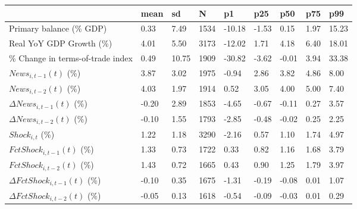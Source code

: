\begin{table}[htbp]
\begin{tabular}{|l|l|l|l|l|l|l|l|l|}\hline  
 & mean  & sd  & N  & p1  & p25  & p50  & p75  & p99  \\ \hline  
Primary balance (\% GDP) &      0.33 &      7.49 &      1534 &    -10.18 &     -1.53 &      0.15 &      1.97 &     15.23 \\ \hline 
Real YoY GDP Growth (\%) &      4.01 &      5.50 &      3173 &    -12.02 &      1.71 &      4.18 &      6.40 &     18.01 \\ \hline 
\% Change in terms-of-trade index &      0.49 &     10.75 &      1909 &    -30.82 &     -3.62 &     -0.01 &      3.94 &     33.38 \\ \hline 
$ News_{i,t-1}(t)$ (\%) &      3.87 &      3.02 &      1975 &     -0.94 &      2.86 &      3.82 &      4.86 &      8.00 \\ \hline 
$ News_{i,t-2}(t)$ (\%) &      4.03 &      1.97 &      1914 &      0.52 &      3.05 &      4.00 &      5.00 &      7.40 \\ \hline 
$ \Delta News_{i,t-1}(t)$ (\%) &     -0.20 &      2.89 &      1853 &     -4.65 &     -0.67 &     -0.11 &      0.27 &      3.57 \\ \hline 
$ \Delta News_{i,t-2}(t)$ (\%) &     -0.10 &      1.55 &      1793 &     -2.85 &     -0.48 &     -0.02 &      0.25 &      2.25 \\ \hline 
$ Shock_{i,t}$ (\%) &      1.22 &      1.18 &      3290 &     -2.16 &      0.57 &      1.10 &      1.74 &      4.97 \\ \hline 
$ FctShock_{i,t-1}(t)$ (\%) &      1.33 &      0.73 &      1722 &      0.33 &      0.82 &      1.16 &      1.68 &      3.79 \\ \hline 
$ FctShock_{i,t-2}(t)$ (\%) &      1.43 &      0.72 &      1665 &      0.43 &      0.90 &      1.25 &      1.79 &      3.97 \\ \hline 
$ \Delta FctShock_{i,t-1}(t)$ (\%) &     -0.10 &      0.35 &      1675 &     -1.31 &     -0.19 &     -0.08 &      0.01 &      1.07 \\ \hline 
$ \Delta FctShock_{i,t-2}(t)$ (\%) &     -0.05 &      0.13 &      1618 &     -0.54 &     -0.09 &     -0.03 &      0.01 &      0.29 \\ \hline 
  \end{tabular}
\end{table}
